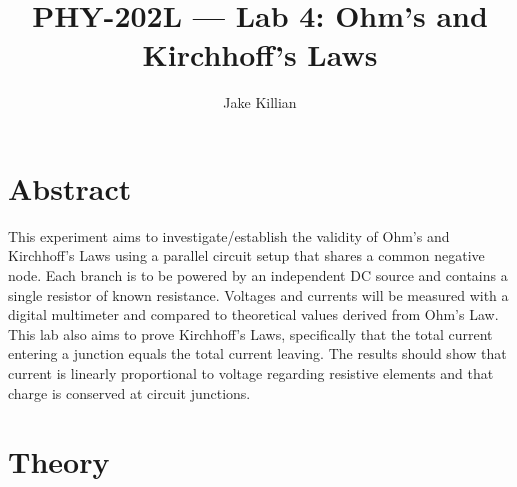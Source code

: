 \documentclass[11pt]{article}
\title{PHY-202L — Lab 4: Ohm's and Kirchhoff's Laws}
\author{Jake Killian}
\date{}
\begin{document}
\maketitle

\section{Abstract}
This experiment aims to investigate/establish the validity of Ohm’s and Kirchhoff’s Laws using a parallel circuit setup that shares a common negative node.
Each branch is to be powered by an independent DC source and contains a single resistor of known resistance.
Voltages and currents will be measured with a digital multimeter and compared to theoretical values derived from Ohm’s Law.
This lab also aims to prove Kirchhoff's Laws, specifically that the total current entering a junction equals the total current leaving.
The results should show that current is linearly proportional to voltage regarding resistive elements and that charge is conserved at circuit junctions.

\section{Theory}
\end{document}
